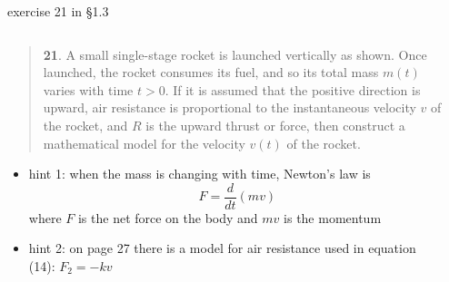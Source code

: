 \documentclass{beamer}
\begin{document}
\begin{frame}{exercise 21 in \S 1.3}

\begin{columns}
\begin{column}{0.75\textwidth}
\scriptsize
\begin{quotation}
\noindent \textbf{21}.  A small single-stage rocket is launched vertically as shown.  Once launched, the rocket consumes its fuel, and so its total mass $m(t)$ varies with time $t>0$.  If it is assumed that the positive direction is upward, air resistance is proportional to the instantaneous velocity $v$ of the rocket, and $R$ is the upward thrust or force, then construct a mathematical model for the velocity $v(t)$ of the rocket.
\end{quotation}

\small
\begin{itemize}
\item hint 1: when the mass is changing with time, Newton's law is
\begin{equation}
F = \frac{d}{dt}\left(mv\right) \tag{17}
\end{equation}
where $F$ is the net force on the body and $mv$ is the momentum
\item hint 2: on page 27 there is a model for air resistance used in equation (14): $F_2 = - k v$
\end{itemize}
\end{column}
\begin{column}{0.3\textwidth}

\end{column}
\end{columns}
\end{frame}
\end{document}
